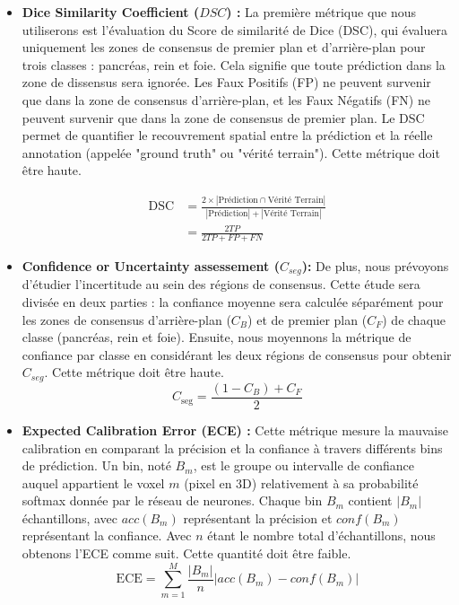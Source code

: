 \documentclass[a4paper,french,bookmarks,12pt]{article}
\begin{document}
    \begin{itemize}
        \item \textbf{Dice Similarity Coefficient ($DSC$) :}
        La première métrique que nous utiliserons est l'évaluation du Score de similarité de Dice (DSC), qui évaluera uniquement les zones de consensus de premier plan et d'arrière-plan pour trois classes : pancréas, rein et foie. Cela signifie que toute prédiction dans la zone de dissensus sera ignorée. Les Faux Positifs (FP) ne peuvent survenir que dans la zone de consensus d'arrière-plan, et les Faux Négatifs (FN) ne peuvent survenir que dans la zone de consensus de premier plan. Le DSC permet de quantifier le recouvrement spatial entre la prédiction et la réelle annotation (appelée "ground truth" ou "vérité terrain"). Cette métrique doit être haute.
    
        \begin{align*}
            \text{DSC} &= \frac{2 \times |\text{Prédiction} \cap \text{Vérité Terrain}|}{|\text{Prédiction}| + |\text{Vérité Terrain}|} \\
                      &= \frac{2TP}{2TP + FP + FN}
        \end{align*}
    
        \item \textbf{Confidence or Uncertainty assessement ($C_{seg}$):} De plus, nous prévoyons d'étudier l'incertitude au sein des régions de consensus. Cette étude sera divisée en deux parties : la confiance moyenne sera calculée séparément pour les zones de consensus d'arrière-plan ($C_B$) et de premier plan ($C_F$) de chaque classe (pancréas, rein et foie). Ensuite, nous moyennons la métrique de confiance par classe en considérant les deux régions de consensus pour obtenir $C_{seg}$. Cette métrique doit être haute.
        \[ C_{\text{seg}} = \frac{(1 - C_B) + C_F}{2} \]
    
        \item \textbf{Expected Calibration Error (ECE) :}
        Cette métrique mesure la mauvaise calibration en comparant la précision et la confiance à travers différents bins de prédiction. Un bin, noté \( B_m \), est le groupe ou intervalle de confiance auquel appartient le voxel \( m \) (pixel en 3D) relativement à sa probabilité softmax donnée par le réseau de neurones. Chaque bin \( B_m \) contient \( |B_m| \) échantillons, avec \( acc(B_m) \) représentant la précision et \( conf(B_m) \) représentant la confiance. Avec \( n \) étant le nombre total d'échantillons, nous obtenons l'ECE comme suit. Cette quantité doit être faible.
        \[
        \text{ECE} = \sum_{m=1}^{M} \frac{|B_m|}{n} \big| acc(B_m) - conf(B_m) \big|
        \]
    

\end{itemize}
\end{document}
